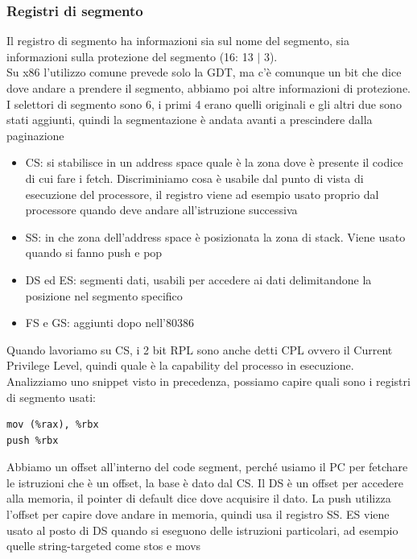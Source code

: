 \documentclass[12pt, oneside]{extbook}
\begin{document}
\subsubsection{Registri di segmento}
Il registro di segmento ha informazioni sia sul nome del segmento, sia informazioni sulla protezione del segmento (16: 13 $|$ 3).\\ Su x86 l'utilizzo comune prevede solo la GDT, ma c'è comunque un bit che dice dove andare a prendere il segmento, abbiamo poi altre informazioni di protezione. I selettori di segmento sono 6, i primi 4 erano quelli originali e gli altri due sono stati aggiunti, quindi la segmentazione è andata avanti a prescindere dalla paginazione
\begin{itemize}
\item CS: si stabilisce in un address space quale è la zona dove è presente il codice di cui fare i fetch. Discriminiamo cosa è usabile dal punto di vista di esecuzione del processore, il registro viene ad esempio usato proprio dal processore quando deve andare all'istruzione successiva
\item SS: in che zona dell'address space è posizionata la zona di stack. Viene usato quando si fanno push e pop
\item DS ed ES: segmenti dati, usabili per accedere ai dati delimitandone la posizione nel segmento specifico
\item FS e GS: aggiunti dopo nell'80386
\end{itemize}
Quando lavoriamo su CS, i 2 bit RPL sono anche detti CPL ovvero il Current Privilege Level, quindi quale è la capability del processo in esecuzione.\\ Analizziamo uno snippet visto in precedenza, possiamo capire quali sono i registri di segmento usati:
\begin{lstlisting}
mov (%rax), %rbx
push %rbx
\end{lstlisting}
Abbiamo un offset all'interno del code segment, perché usiamo il PC per fetchare le istruzioni che è un offset, la base è dato dal CS. Il DS è un offset per accedere alla memoria, il pointer di default dice dove acquisire il dato. La push utilizza l'offset per capire dove andare in memoria, quindi usa il registro SS. ES viene usato al posto di DS quando si eseguono delle istruzioni particolari, ad esempio quelle string-targeted come \textsf{stos} e \textsf{movs}
\end{document}
